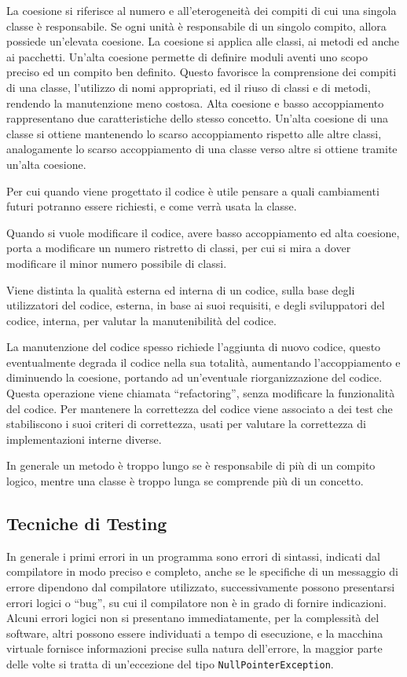 \documentclass{article}
\numberwithin{equation}{subsection}
\begin{document}
La coesione si riferisce al numero e all'eterogeneità dei compiti di cui una singola classe è responsabile. Se ogni unità è responsabile di un singolo compito, allora possiede 
un'elevata coesione. La coesione si applica alle classi, ai metodi ed anche ai pacchetti. Un'alta coesione permette di definire moduli aventi uno scopo preciso ed un compito ben 
definito. Questo favorisce la comprensione dei compiti di una classe, l'utilizzo di nomi appropriati, ed il riuso di classi e di metodi, rendendo la manutenzione meno costosa. 
Alta coesione e basso accoppiamento rappresentano due caratteristiche dello stesso concetto. 
Un'alta coesione di una classe si ottiene mantenendo lo scarso accoppiamento rispetto alle altre classi, analogamente lo scarso accoppiamento di una classe verso altre si ottiene tramite 
un'alta coesione. 

Per cui quando viene progettato il codice è utile pensare a quali cambiamenti futuri potranno essere richiesti, e come verrà usata la classe. 

Quando si vuole modificare il codice, avere basso accoppiamento ed alta coesione, porta a modificare un numero ristretto di classi, per cui si mira a dover modificare il minor numero possibile 
di classi. 

Viene distinta la qualità esterna ed interna di un codice, sulla base degli utilizzatori del codice, esterna, in base ai suoi requisiti, e degli sviluppatori del codice, interna, per 
valutar la manutenibilità del codice.  

La manutenzione del codice spesso richiede l'aggiunta di nuovo codice, questo eventualmente degrada il codice nella sua totalità, aumentando l'accoppiamento e diminuendo la 
coesione, portando ad un'eventuale riorganizzazione del codice. Questa operazione viene chiamata ``refactoring'', senza modificare la funzionalità del codice. Per mantenere 
la correttezza del codice viene associato a dei test che stabiliscono i suoi criteri di correttezza, usati per valutare la correttezza di implementazioni interne diverse. 

In generale un metodo è troppo lungo se è responsabile di più di un compito logico, mentre una classe è troppo lunga se comprende più di un concetto. 

\subsection{Tecniche di Testing}

In generale i primi errori in un programma sono errori di sintassi, indicati dal compilatore in modo preciso e completo, anche se le specifiche di un messaggio di errore 
dipendono dal compilatore utilizzato, successivamente possono presentarsi errori logici o ``bug'', su cui il compilatore non è in grado di fornire indicazioni. 
Alcuni errori logici non si presentano immediatamente, per la complessità del software, altri possono essere individuati a tempo di esecuzione, e la macchina virtuale 
fornisce informazioni precise sulla natura dell'errore, la maggior parte delle volte si tratta di un'eccezione del tipo \verb|NullPointerException|. 
\end{document}
